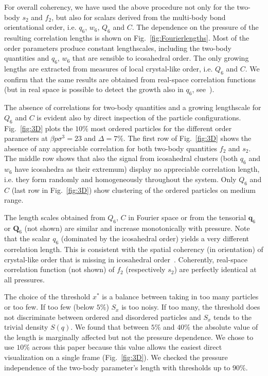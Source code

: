 \documentclass[twocolumn,superscriptaddress]{revtex4}
\begin{document}
For overall coherency, we have used the above procedure not only for the two-body $s_2$ and $f_2$, but also for scalars derived from the multi-body bond orientational order, i.e. $q_6$, $w_6$, $Q_6$ and $C$. The dependence on the pressure of the resulting correlation lengths is shown on Fig.~\ref{fig:Fourierlengths}. Most of the order parameters produce constant lengthscales, including the two-body quantities and $q_6$, $w_6$ that are sensible to icosahedral order. The only growing lengths are extracted from measures of local crystal-like order, i.e. $Q_6$ and $C$. We confirm that the same results are obtained from real-space correlation functions (but in
real space is possible to detect the growth also in $q_6$, see~\cite{nota_q6}).

The absence of correlations for two-body quantities and a growing lengthscale for $Q_6$ and $C$ is evident also by direct inspection of the particle configurations.
Fig.~\ref{fig:3D} plots the $10\%$ most ordered particles for the different order parameters at $\beta p\sigma^3=23$ and $\Delta=7\%$. The first row of Fig.~\ref{fig:3D} shows the absence of any
appreciable correlation for both two-body quantities $f_2$ and $s_2$. The middle row shows that also the signal from icosahedral clusters
(both $q_6$ and $w_6$ have icosahedra as their extremum) display no appreciable correlation length, i.e. they form randomly and homogeneously throughout the system. 
Only $Q_6$ and $C$ (last row in Fig.~\ref{fig:3D}) show clustering of the ordered particles on medium range.

The length scales obtained from $Q_6$, $C$ in Fourier space or from the tensorial $\mathbf{q}_6$ or $\mathbf{Q}_6$ (not shown) are similar and increase monotonically with pressure. Note that the scalar $q_6$ (dominated by the icosahedral order) yields a very different correlation length. This is consistent with the spatial coherency (in orientation) of crystal-like order that is missing in icosahedral order~\cite{tanaka,mathieu_icosahedra}. Coherently, real-space correlation function (not shown) of $f_2$ (respectively $s_2$) are perfectly identical at all pressures. 

The choice of the threshold $x^*$ is a balance between taking in too many particles or too few. If too few (below $5\%$) $S_x$ is too noisy. If too many, the threshold does not discriminate between ordered and disordered particles and $S_x$ tends to the trivial density $S(q)$. We found that between $5\%$ and $40\%$ the absolute value of the length is marginally affected but not the pressure dependence. We chose to use $10\%$ across this paper because this value allows the easiest direct visualization on a single frame (Fig.~\ref{fig:3D}). We checked the pressure independence of the two-body parameter's length with thresholds up to $90\%$. 
\end{document}
